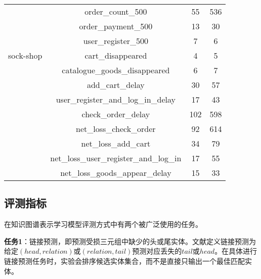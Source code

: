 \begin{table}[htbp]
\begin{tabular}{cccc}
                 & order\_count\_500                       & 55       & 536        \\
                 & order\_payment\_500                     & 13       & 30         \\
                 & user\_register\_500                     & 7        & 6          \\
    sock-shop    & cart\_disappeared                       & 4        & 5          \\
                 & catalogue\_goods\_disappeared           & 6        & 7          \\
                 & add\_cart\_delay                        & 30       & 57         \\
                 & user\_register\_and\_log\_in\_delay     & 17       & 43         \\
                 & check\_order\_delay                     & 102      & 598        \\
                 & net\_loss\_check\_order                 & 92       & 614        \\
                 & net\_loss\_add\_cart                    & 34       & 79         \\
                 & net\_loss\_user\_register\_and\_log\_in & 17       & 55         \\
                 & net\_loss\_goods\_appear\_delay         & 15       & 33         \\ \bottomrule[1.5pt]
    \end{tabular}
\end{table}


\subsection{评测指标}
在知识图谱表示学习模型评测方式中有两个被广泛使用的任务。

\textbf{任务1}：链接预测，即预测受损三元组中缺少的头或尾实体。文献\parencite{bordes2011learning,bordes2013translatingE}定义链接预测为给定$(head,relation)$或$(relation,tail)$预测对应丢失的$tail$或$head$。在具体进行链接预测任务时，实验会排序候选实体集合，而不是直接只输出一个最佳匹配实体。

